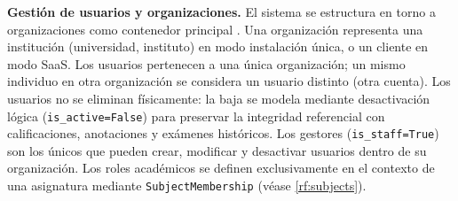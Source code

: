 
\item \textbf{Gestión de usuarios y organizaciones.} \label{rf:users}
El sistema se estructura en torno a organizaciones como contenedor principal
. Una organización representa una institución (universidad, instituto)
en modo instalación única, o un cliente en modo SaaS. Los usuarios pertenecen a una única
organización; un mismo individuo en otra organización se considera un usuario distinto
(otra cuenta). Los usuarios no se eliminan físicamente: la baja se modela mediante
desactivación lógica (\texttt{is\_active=False}) para preservar la integridad referencial
con calificaciones, anotaciones y exámenes históricos. Los gestores
(\texttt{is\_staff=True}) son los únicos que pueden crear, modificar y desactivar usuarios
dentro de su organización. Los roles académicos se definen exclusivamente en el contexto
de una asignatura mediante \texttt{SubjectMembership} (véase \cref{rf:subjects}).

